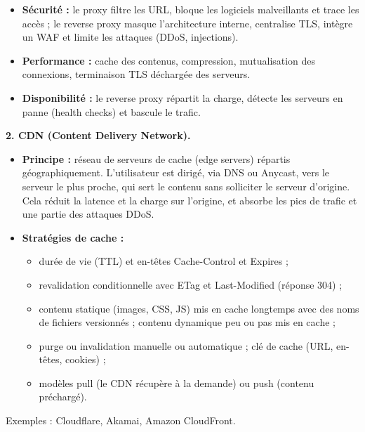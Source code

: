 \documentclass[12pt,a4paper]{article}
\begin{document}
\begin{itemize}
    \item \textbf{Sécurité :} le proxy filtre les URL, bloque les
    logiciels malveillants et trace les accès ; le reverse proxy masque
    l'architecture interne, centralise TLS, intègre un WAF et limite les
    attaques (DDoS, injections).
    \item \textbf{Performance :} cache des contenus, compression,
    mutualisation des connexions, terminaison TLS déchargée des serveurs.
    \item \textbf{Disponibilité :} le reverse proxy répartit la charge,
    détecte les serveurs en panne (health checks) et bascule le trafic.
\end{itemize}

\textbf{2. CDN (Content Delivery Network).}
\begin{itemize}
    \item \textbf{Principe :} réseau de serveurs de cache (edge servers)
    répartis géographiquement. L'utilisateur est dirigé, via DNS ou
    Anycast, vers le serveur le plus proche, qui sert le contenu sans
    solliciter le serveur d'origine. Cela réduit la latence et la charge
    sur l'origine, et absorbe les pics de trafic et une partie des
    attaques DDoS.
    \item \textbf{Stratégies de cache :}
    \begin{itemize}
        \item durée de vie (TTL) et en-têtes Cache-Control et Expires ;
        \item revalidation conditionnelle avec ETag et Last-Modified
        (réponse 304) ;
        \item contenu statique (images, CSS, JS) mis en cache longtemps
        avec des noms de fichiers versionnés ; contenu dynamique peu ou
        pas mis en cache ;
        \item purge ou invalidation manuelle ou automatique ; clé de
        cache (URL, en-têtes, cookies) ;
        \item modèles pull (le CDN récupère à la demande) ou push
        (contenu préchargé).
    \end{itemize}
\end{itemize}
Exemples : Cloudflare, Akamai, Amazon CloudFront.
\end{document}
